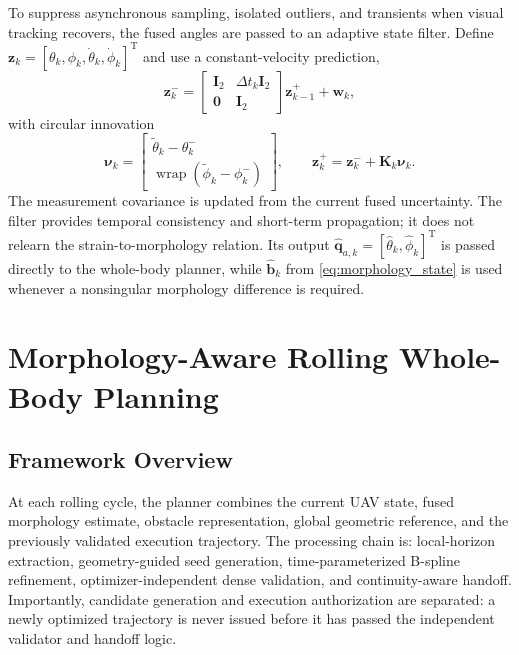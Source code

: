 \documentclass[journal,twoside]{IEEEtran}
\newcommand{\wrap}{\operatorname{wrap}}
\begin{document}
To suppress asynchronous sampling, isolated outliers, and transients when visual tracking recovers, the fused angles are passed to an adaptive state filter. Define $\mathbf z_k=[\theta_k,\phi_k,\dot\theta_k,\dot\phi_k]^{\mathrm T}$ and use a constant-velocity prediction,
\begin{equation}
\mathbf z_k^-=
\begin{bmatrix}
\mathbf I_2&\Delta t_k\mathbf I_2\\
\mathbf 0&\mathbf I_2
\end{bmatrix}\mathbf z_{k-1}^+ +\mathbf w_k,
\label{eq:filter_predict}
\end{equation}
with circular innovation
\begin{equation}
\boldsymbol\nu_k=
\begin{bmatrix}
\tilde\theta_k-\theta_k^-\\
\wrap(\tilde\phi_k-\phi_k^-)
\end{bmatrix},
\qquad
\mathbf z_k^+=\mathbf z_k^-+\mathbf K_k\boldsymbol\nu_k.
\label{eq:filter_update}
\end{equation}
The measurement covariance is updated from the current fused uncertainty. The filter provides temporal consistency and short-term propagation; it does not relearn the strain-to-morphology relation. Its output $\hat{\mathbf q}_{a,k}=[\hat\theta_k,\hat\phi_k]^{\mathrm T}$ is passed directly to the whole-body planner, while $\hat{\mathbf b}_k$ from \eqref{eq:morphology_state} is used whenever a nonsingular morphology difference is required.

\section{Morphology-Aware Rolling Whole-Body Planning}
\subsection{Framework Overview}
At each rolling cycle, the planner combines the current UAV state, fused morphology estimate, obstacle representation, global geometric reference, and the previously validated execution trajectory. The processing chain is: local-horizon extraction, geometry-guided seed generation, time-parameterized B-spline refinement, optimizer-independent dense validation, and continuity-aware handoff. Importantly, candidate generation and execution authorization are separated: a newly optimized trajectory is never issued before it has passed the independent validator and handoff logic.
\end{document}

